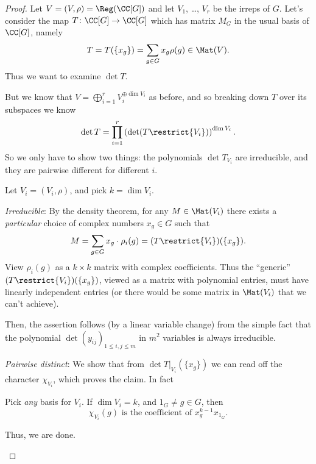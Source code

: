 \begin{proof}
	Let $V = (V, \rho) = \Reg(\CC[G])$ and let $V_1$, \dots, $V_r$
	be the irreps of $G$.
	Let's consider the map $T \colon \CC[G] \to \CC[G]$
	which has matrix $M_G$ in the usual basis of $\CC[G]$, namely
	\[ T = T(\{x_g\}) = \sum_{g \in G} x_g \rho(g) \in \Mat(V). \]
	Thus we want to examine $\det T$.

	But we know that $V = \bigoplus_{i=1}^r V_i^{\oplus \dim V_i}$
	as before, and so breaking down $T$ over its subspaces we know
	\[
		\det T
		= \prod_{i=1}^r \left( \det (T \restrict{V_i})  \right)^{\dim V_i}.
	\]
	So we only have to show two things:
	the polynomials $\det T_{V_i}$ are irreducible,
	and they are pairwise different for different $i$.

	Let $V_i = (V_i, \rho)$, and pick $k = \dim V_i$.
	\begin{itemize}
		\ii \emph{Irreducible}:
		By the density theorem, for any $M \in \Mat(V_i)$ there exists
		a \emph{particular} choice of complex numbers $x_g \in G$ such that
		\[
			M = \sum_{g \in G} x_g
			\cdot \rho_i(g)
			= (T \restrict{V_i})(\{x_g\}).
		\]
		View $\rho_i(g)$ as a $k \times k$ matrix with complex coefficients.
		Thus the ``generic'' $(T \restrict{V_i})(\{x_g\})$, viewed as a matrix with
		polynomial entries, must have linearly independent entries
		(or there would be some matrix in $\Mat(V_i)$ that we can't achieve).

		Then, the assertion follows (by a linear variable change)
		from the simple fact that the polynomial
		$\det (y_{ij})_{1 \le i, j \le m}$ in $m^2$ variables
		is always irreducible.

		\ii \emph{Pairwise distinct}:
		We show that from $\det T|_{V_i}(\{x_g\})$ we can read
		off the character $\chi_{V_i}$, which proves the claim.
		In fact
		\begin{exercise}
			Pick \emph{any} basis for $V_i$.
			If $\dim V_i = k$, and $1_G \neq g \in G$, then
			\[
				\chi_{V_i} (g)
				\text{ is the coefficient of } x_g^{k-1} x_{1_G}.
			\]
		\end{exercise}
		Thus, we are done. \qedhere
	\end{itemize}
\end{proof}
